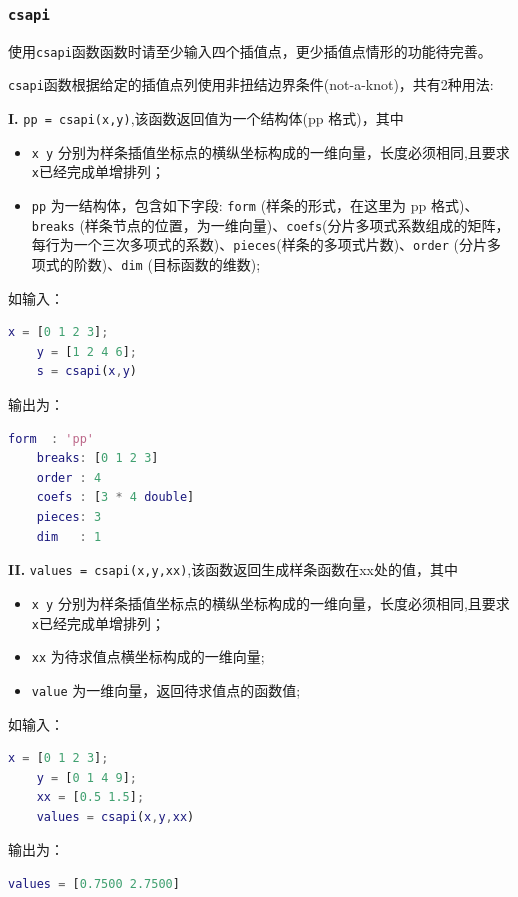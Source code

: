 \subsubsection{\texttt{csapi}}

使用\texttt{csapi}函数函数时请至少输入四个插值点，更少插值点情形的功能待完善。

\texttt{csapi}函数根据给定的插值点列使用非扭结边界条件(not-a-knot)，共有2种用法:

\textbf{I.}  \texttt{pp = csapi(x,y)},该函数返回值为一个结构体(pp 格式)，其中

\begin{itemize}
    \item \texttt{x y} 分别为样条插值坐标点的横纵坐标构成的一维向量，长度必须相同,且要求\texttt{x}已经完成单增排列；
    \item \texttt{pp} 为一结构体，包含如下字段: \texttt{form} (样条的形式，在这里为 pp 格式)、\texttt{breaks} (样条节点的位置，为一维向量)、\texttt{coefs}(分片多项式系数组成的矩阵，每行为一个三次多项式的系数)、\texttt{pieces}(样条的多项式片数)、\texttt{order} (分片多项式的阶数)、\texttt{dim} (目标函数的维数);
\end{itemize}

如输入：
\begin{lstlisting}[language = matlab]
    x = [0 1 2 3]; 
    y = [1 2 4 6]; 
    s = csapi(x,y)
\end{lstlisting}

输出为：
\begin{lstlisting}[language = matlab ]
    form  : 'pp'
    breaks: [0 1 2 3]
    order : 4
    coefs : [3 * 4 double]
    pieces: 3
    dim   : 1
\end{lstlisting}

\textbf{II.}  \texttt{values = csapi(x,y,xx)},该函数返回生成样条函数在xx处的值，其中
\begin{itemize}
    \item \texttt{x y} 分别为样条插值坐标点的横纵坐标构成的一维向量，长度必须相同,且要求\texttt{x}已经完成单增排列；
    \item \texttt{xx} 为待求值点横坐标构成的一维向量;
    \item \texttt{value} 为一维向量，返回待求值点的函数值;
\end{itemize}

如输入：
\begin{lstlisting}[language = matlab]
    x = [0 1 2 3]; 
    y = [0 1 4 9]; 
    xx = [0.5 1.5]; 
    values = csapi(x,y,xx)
\end{lstlisting}

输出为：
\begin{lstlisting}[language = matlab ]
    values = [0.7500 2.7500]
\end{lstlisting}